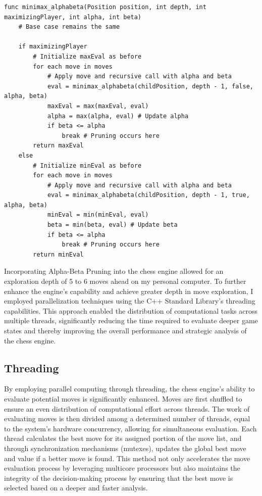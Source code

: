 \documentclass{article}
\begin{document}
\begin{lstlisting}[caption=Pseudo-Code of Alpha-Beta Pruning Enhancements, label=lst:pseudocode]
func minimax_alphabeta(Position position, int depth, int maximizingPlayer, int alpha, int beta)
    # Base case remains the same

    if maximizingPlayer
        # Initialize maxEval as before
        for each move in moves
            # Apply move and recursive call with alpha and beta
            eval = minimax_alphabeta(childPosition, depth - 1, false, alpha, beta)
            maxEval = max(maxEval, eval)
            alpha = max(alpha, eval) # Update alpha
            if beta <= alpha
                break # Pruning occurs here
        return maxEval
    else
        # Initialize minEval as before
        for each move in moves
            # Apply move and recursive call with alpha and beta
            eval = minimax_alphabeta(childPosition, depth - 1, true, alpha, beta)
            minEval = min(minEval, eval)
            beta = min(beta, eval) # Update beta
            if beta <= alpha
                break # Pruning occurs here
        return minEval
\end{lstlisting}


Incorporating Alpha-Beta Pruning into the chess engine allowed for an exploration depth of 5 to 6 moves ahead on my personal computer. To further enhance the engine's capability and achieve greater depth in move exploration, I employed parallelization techniques using the C++ Standard Library's threading capabilities. This approach enabled the distribution of computational tasks across multiple threads, significantly reducing the time required to evaluate deeper game states and thereby improving the overall performance and strategic analysis of the chess engine.


\subsection{Threading}
By employing parallel computing through threading, the chess engine's ability to evaluate potential moves is significantly enhanced. Moves are first shuffled to ensure an even distribution of computational effort across threads. The work of evaluating moves is then divided among a determined number of threads, equal to the system's hardware concurrency, allowing for simultaneous evaluation. Each thread calculates the best move for its assigned portion of the move list, and through synchronization mechanisms (mutexes), updates the global best move and value if a better move is found. This method not only accelerates the move evaluation process by leveraging multicore processors but also maintains the integrity of the decision-making process by ensuring that the best move is selected based on a deeper and faster analysis.
\end{document}
